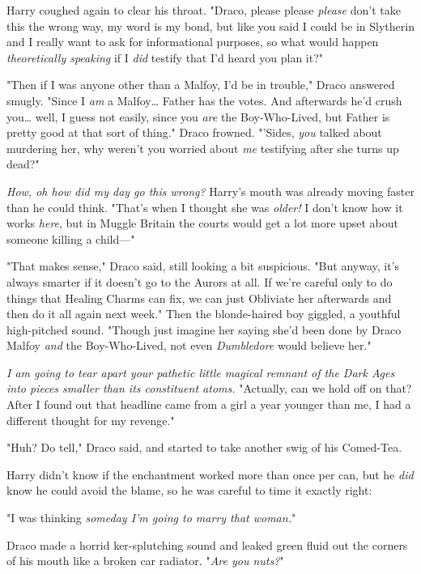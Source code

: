 Harry coughed again to clear his throat. "Draco, please please \emph{please} 
don't take this the wrong way, my word is my bond, but like you said I could be 
in Slytherin and I really want to ask for informational purposes, so what would 
happen \emph{theoretically speaking} if I \emph{did} testify that I'd heard you 
plan it?"

"Then if I was anyone other than a Malfoy, I'd be in trouble," Draco answered 
smugly. "Since I \emph{am} a Malfoy{\ldots} Father has the votes. And 
afterwards he'd crush you{\ldots} well, I guess not easily, since you 
\emph{are} the Boy-Who-Lived, but Father is pretty good at that sort of thing." 
Draco frowned. "'Sides, \emph{you} talked about murdering her, why weren't you 
worried about \emph{me} testifying after she turns up dead?"

\emph{How, oh how did my day go this wrong?} Harry's mouth was already moving 
faster than he could think. "That's when I thought she was\emph{ older!} I 
don't know how it works \emph{here}, but in Muggle Britain the courts would get 
a lot more upset about someone killing a child---"

"That makes sense," Draco said, still looking a bit suspicious. "But anyway, 
it's always smarter if it doesn't go to the Aurors at all. If we're careful 
only to do things that Healing Charms can fix, we can just Obliviate her 
afterwards and then do it all again next week." Then the blonde-haired boy 
giggled, a youthful high-pitched sound. "Though just imagine her saying she'd 
been done by Draco Malfoy \emph{and} the Boy-Who-Lived, not even 
\emph{Dumbledore} would believe her."

\emph{I am going to tear apart your pathetic little magical remnant of the Dark 
Ages into pieces smaller than its constituent atoms.} "Actually, can we hold 
off on that? After I found out that headline came from a girl a year younger 
than me, I had a different thought for my revenge."

"Huh? Do tell," Draco said, and started to take another swig of his Comed-Tea.

Harry didn't know if the enchantment worked more than once per can, but he 
\emph{did} know he could avoid the blame, so he was careful to time it exactly 
right:

"I was thinking \emph{someday I'm going to marry that woman.}"

Draco made a horrid ker-splutching sound and leaked green fluid out the corners 
of his mouth like a broken car radiator. "\emph{Are you nuts?}"

